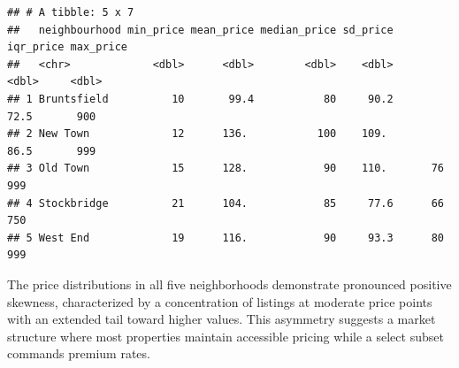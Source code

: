 \documentclass[
]{article}
\newenvironment{Shaded}{\begin{snugshade}}{\end{snugshade}}
\newcommand{\AttributeTok}[1]{\textcolor[rgb]{0.13,0.29,0.53}{#1}}
\newcommand{\ConstantTok}[1]{\textcolor[rgb]{0.56,0.35,0.01}{#1}}
\newcommand{\DecValTok}[1]{\textcolor[rgb]{0.00,0.00,0.81}{#1}}
\newcommand{\FunctionTok}[1]{\textcolor[rgb]{0.13,0.29,0.53}{\textbf{#1}}}
\newcommand{\NormalTok}[1]{#1}
\newcommand{\OtherTok}[1]{\textcolor[rgb]{0.56,0.35,0.01}{#1}}
\newcommand{\SpecialCharTok}[1]{\textcolor[rgb]{0.81,0.36,0.00}{\textbf{#1}}}
\begin{document}
\begin{Shaded}
\end{Shaded}

\begin{verbatim}
## # A tibble: 5 x 7
##   neighbourhood min_price mean_price median_price sd_price iqr_price max_price
##   <chr>             <dbl>      <dbl>        <dbl>    <dbl>     <dbl>     <dbl>
## 1 Bruntsfield          10       99.4           80     90.2      72.5       900
## 2 New Town             12      136.           100    109.       86.5       999
## 3 Old Town             15      128.            90    110.       76         999
## 4 Stockbridge          21      104.            85     77.6      66         750
## 5 West End             19      116.            90     93.3      80         999
\end{verbatim}

The price distributions in all five neighborhoods demonstrate pronounced
positive skewness, characterized by a concentration of listings at
moderate price points with an extended tail toward higher values. This
asymmetry suggests a market structure where most properties maintain
accessible pricing while a select subset commands premium rates.
\end{document}
